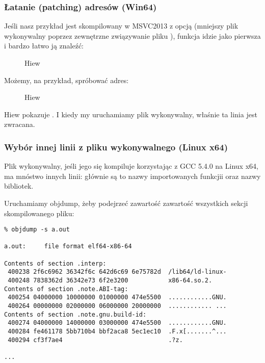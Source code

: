 \subsubsection{Łatanie (patching) adresów (Win64)}

Jeśli nasz przykład jest skompilowany w MSVC2013 z opcją 
(mniejszy plik wykonywalny poprzez zewnętrzne związywanie pliku ),
funkcja \main idzie jako pierwsza i bardzo łatwo ją znaleźć:

\begin{figure}[H]
\centering
{}
\caption{Hiew}
\label{}
\end{figure}

Możemy, na przykład, spróbować  adres:

\begin{figure}[H]
\centering
{}
\caption{Hiew}
\label{}
\end{figure}

Hiew pokazuje .
I kiedy my uruchamiamy plik wykonywalny, właśnie ta linia jest zwracana.

\subsubsection{Wybór innej linii z pliku wykonywalnego (Linux x64)}

Plik wykonywalny, jeśli jego się kompiluje korzystając z GCC 5.4.0 na Linux x64, ma mnóstwo innych linii:
głównie są to nazwy importowanych funkcjii oraz nazwy bibliotek.

Uruchamiamy objdump, żeby podejrzeć zawartość zawartość wszystkich sekcji skompilowanego pliku:

\begin{lstlisting}
% objdump -s a.out

a.out:     file format elf64-x86-64

Contents of section .interp:
 400238 2f6c6962 36342f6c 642d6c69 6e75782d  /lib64/ld-linux-
 400248 7838362d 36342e73 6f2e3200           x86-64.so.2.
Contents of section .note.ABI-tag:
 400254 04000000 10000000 01000000 474e5500  ............GNU.
 400264 00000000 02000000 06000000 20000000  ............ ...
Contents of section .note.gnu.build-id:
 400274 04000000 14000000 03000000 474e5500  ............GNU.
 400284 fe461178 5bb710b4 bbf2aca8 5ec1ec10  .F.x[.......^...
 400294 cf3f7ae4                             .?z.

...
\end{lstlisting}

